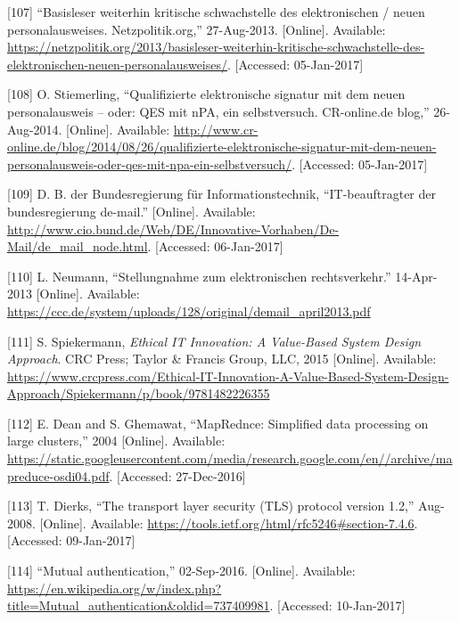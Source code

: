 \documentclass[12pt,english,a4paper,titlepage,cleardoublepage=empty,dottedtoc]{report}
\begin{document}
\hypertarget{ref-web_2013_npa-sicherheitsdefizit}{}
{[}107{]} ``Basisleser weiterhin kritische schwachstelle des
elektronischen / neuen personalausweises. Netzpolitik.org,''
27-Aug-2013. {[}Online{]}. Available:
\url{https://netzpolitik.org/2013/basisleser-weiterhin-kritische-schwachstelle-des-elektronischen-neuen-personalausweises/}.
{[}Accessed: 05-Jan-2017{]}

\hypertarget{ref-web_2014_test-qes-support-in-npa}{}
{[}108{]} O. Stiemerling, ``Qualifizierte elektronische signatur mit dem
neuen personalausweis -- oder: QES mit nPA, ein selbstversuch.
CR-online.de blog,'' 26-Aug-2014. {[}Online{]}. Available:
\url{http://www.cr-online.de/blog/2014/08/26/qualifizierte-elektronische-signatur-mit-dem-neuen-personalausweis-oder-qes-mit-npa-ein-selbstversuch/}.
{[}Accessed: 05-Jan-2017{]}

\hypertarget{ref-web_2017_about-de-mail}{}
{[}109{]} D. B. der Bundesregierung für Informationstechnik,
``IT-beauftragter der bundesregierung de-mail.'' {[}Online{]}.
Available:
\url{http://www.cio.bund.de/Web/DE/Innovative-Vorhaben/De-Mail/de_mail_node.html}.
{[}Accessed: 06-Jan-2017{]}

\hypertarget{ref-statement_2013_de-mail}{}
{[}110{]} L. Neumann, ``Stellungnahme zum elektronischen
rechtsverkehr.'' 14-Apr-2013 {[}Online{]}. Available:
\url{https://ccc.de/system/uploads/128/original/demail_april2013.pdf}

\hypertarget{ref-book_2015_ethical-it-innovation}{}
{[}111{]} S. Spiekermann, \emph{Ethical IT Innovation: A Value-Based
System Design Approach}. CRC Press; Taylor \& Francis Group, LLC, 2015
{[}Online{]}. Available:
\url{https://www.crcpress.com/Ethical-IT-Innovation-A-Value-Based-System-Design-Approach/Spiekermann/p/book/9781482226355}

\hypertarget{ref-paper_2004_distributed-mapreduce}{}
{[}112{]} E. Dean and S. Ghemawat, ``MapRednce: Simplified data
processing on large clusters,'' 2004 {[}Online{]}. Available:
\url{https://static.googleusercontent.com/media/research.google.com/en//archive/mapreduce-osdi04.pdf}.
{[}Accessed: 27-Dec-2016{]}

\hypertarget{ref-web_spec_tls-12_client-auth}{}
{[}113{]} T. Dierks, ``The transport layer security (TLS) protocol
version 1.2,'' Aug-2008. {[}Online{]}. Available:
\url{https://tools.ietf.org/html/rfc5246\#section-7.4.6}. {[}Accessed:
09-Jan-2017{]}

\hypertarget{ref-web_2017_wikipedia_mutual-auth}{}
{[}114{]} ``Mutual authentication,'' 02-Sep-2016. {[}Online{]}.
Available:
\url{https://en.wikipedia.org/w/index.php?title=Mutual_authentication\&oldid=737409981}.
{[}Accessed: 10-Jan-2017{]}
\end{document}
